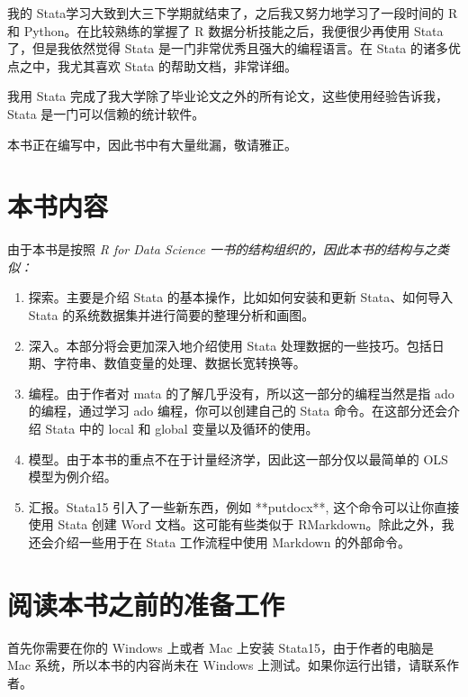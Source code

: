 我的 Stata学习大致到大三下学期就结束了，之后我又努力地学习了一段时间的 R 和 Python。在比较熟练的掌握了 R 数据分析技能之后，我便很少再使用 Stata 了，但是我依然觉得 Stata 是一门非常优秀且强大的编程语言。在 Stata 的诸多优点之中，我尤其喜欢 Stata 的帮助文档，非常详细。

我用 Stata 完成了我大学除了毕业论文之外的所有论文，这些使用经验告诉我，Stata 是一门可以信赖的统计软件。

\begin{note}
本书正在编写中，因此书中有大量纰漏，敬请雅正。
\end{note}

\section{本书内容}

由于本书是按照 \it{R for Data Science} 一书的结构组织的，因此本书的结构与之类似：

\begin{enumerate}
  \item 探索。主要是介绍 Stata 的基本操作，比如如何安装和更新 Stata、如何导入 Stata 的系统数据集并进行简要的整理分析和画图。

  \item 深入。本部分将会更加深入地介绍使用 Stata 处理数据的一些技巧。包括日期、字符串、数值变量的处理、数据长宽转换等。

  \item 编程。由于作者对 mata 的了解几乎没有，所以这一部分的编程当然是指 ado 的编程，通过学习 ado 编程，你可以创建自己的 Stata 命令。在这部分还会介绍 Stata 中的 local 和 global 变量以及循环的使用。

  \item 模型。由于本书的重点不在于计量经济学，因此这一部分仅以最简单的 OLS 模型为例介绍。

  \item 汇报。Stata15 引入了一些新东西，例如 **putdocx**, 这个命令可以让你直接使用 Stata 创建 Word 文档。这可能有些类似于 RMarkdown。除此之外，我还会介绍一些用于在 Stata 工作流程中使用 Markdown 的外部命令。
\end{enumerate}

\section{阅读本书之前的准备工作}

首先你需要在你的 Windows 上或者 Mac 上安装 Stata15，由于作者的电脑是 Mac 系统，所以本书的内容尚未在 Windows 上测试。如果你运行出错，请联系作者。

